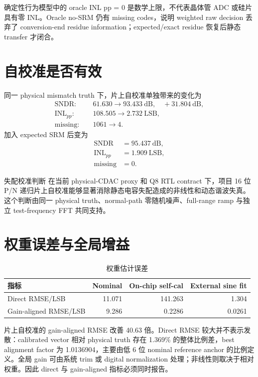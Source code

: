 \documentclass[UTF8,fontset=none,a4paper,11pt,openany]{ctexrep}
\begin{document}
确定性行为模型中的 oracle INL pp = 0 是数学上限，不代表晶体管 ADC 或硅片具有零 INL。Oracle no-SRM 仍有 missing codes，说明 weighted raw decision 丢弃了 conversion-end residue information；expected/exact residue 恢复后静态 transfer 才闭合。

\section{自校准是否有效}

同一 physical mismatch truth 下，片上自校准单独带来的变化为
\begin{align}
\mathrm{SNDR}:&\quad61.630\rightarrow93.433~\mathrm{dB},\quad+31.804~\mathrm{dB},\\
\mathrm{INL}_{pp}:&\quad108.505\rightarrow2.732~\mathrm{LSB},\\
\mathrm{missing}:&\quad1061\rightarrow4.
\end{align}
加入 expected SRM 后变为
\begin{align}
\mathrm{SNDR}&=95.437~\mathrm{dB},\\
\mathrm{INL}_{pp}&=1.909~\mathrm{LSB},\\
\mathrm{missing}&=0.
\end{align}

\begin{passbox}{失配校准判断}
在当前 physical-CDAC proxy 和 Q8 RTL contract 下，项目 16 位 P/N 递归片上自校准能够显著消除静态电容失配造成的非线性和动态谐波失真。这个判断由同一 physical truth、normal-path 零随机噪声、full-range ramp 与独立 test-frequency FFT 共同支持。
\end{passbox}

\section{权重误差与全局增益}

\begin{table}[H]
\centering
\caption{权重估计误差}
\label{tab:weight-error}
\begin{tabular}{lrrr}
\toprule
指标 & Nominal & On-chip self-cal & External sine fit\\
\midrule
Direct RMSE/LSB & 11.071 & 141.263 & 1.304\\
Gain-aligned RMSE/LSB & 9.286 & 0.2286 & 0.0261\\
\bottomrule
\end{tabular}
\end{table}

片上自校准的 gain-aligned RMSE 改善 40.63 倍。Direct RMSE 较大并不表示发散：calibrated vector 相对 physical truth 存在 1.369\% 的整体比例差，best alignment factor 为 1.0136904，主要由低 6 位 nominal reference anchor 的比例定义。全局 gain 可由系统 trim 或 digital normalization 处理；非线性则取决于相对权重。因此 direct 与 gain-aligned 指标必须同时报告。
\end{document}
